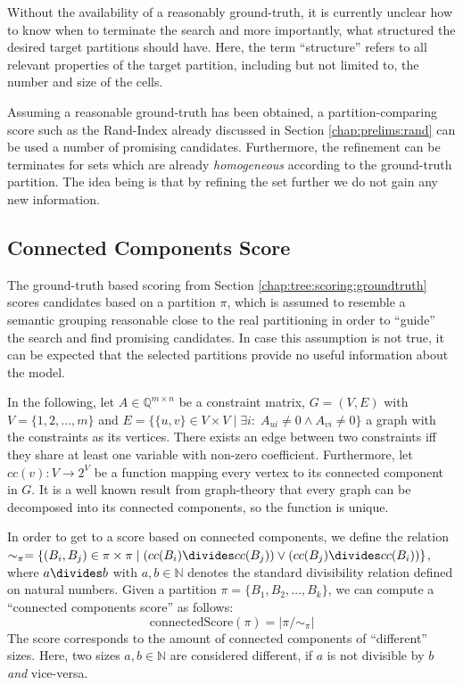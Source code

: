 			Without the availability of a reasonably ground-truth, it is currently unclear how to know when to terminate the search and more importantly, what structured the desired target partitions should have.
			Here, the term \enquote{structure} refers to all relevant properties of the target partition, including but not limited to, the number and size of the cells.
			
			Assuming a reasonable ground-truth has been obtained, a partition-comparing score such as the Rand-Index already discussed in Section \ref{chap:prelims:rand} can be used a number of promising candidates.
			Furthermore, the refinement can be terminates for sets which are already \textit{homogeneous} according to the ground-truth partition.
			The idea being is that by refining the set further we do not gain any new information.
			
			\clearpage
	
		\subsection{Connected Components Score}
	
			The ground-truth based scoring from Section \ref{chap:tree:scoring:groundtruth} scores candidates based on a partition $\pi$, which is assumed to resemble a semantic grouping reasonable close to the real partitioning in order to \enquote{guide} the search and find promising candidates.
			In case this assumption is not true, it can be expected that the selected partitions provide no useful information about the model.
			
			In the following, let $A \in \mathbb{Q}^{m \times n}$ be a constraint matrix, $G = (V, E)$ with $V = \{ 1, 2, \ldots, m \}$ and $E = \{ \{ u, v \} \in V \times V \mid \exists i: \; A_{ui} \neq 0 \land A_{vi} \neq 0 \}$ a graph with the constraints as its vertices.
			There exists an edge between two constraints iff they share at least one variable with non-zero coefficient.
			Furthermore, let $cc(v): V \xrightarrow{} 2^V$ be a function mapping every vertex to its connected component in $G$.
			It is a well known result from graph-theory that every graph can be decomposed into its connected components, so the function is unique.
			
			In order to get to a score based on connected components, we define the relation $\sim_\pi = \{ (B_i, B_j) \in \pi \times \pi \mid (cc(B_i) \divides cc(B_j)) \lor (cc(B_j) \divides cc(B_i)) \}$, where $a \divides b$ with $a, b \in \mathbb{N}$ denotes the standard divisibility relation defined on natural numbers. 
			Given a partition $\pi = \{ B_1, B_2, \ldots, B_k \}$, we can compute a \enquote{connected components score} as follows:
			\begin{equation*}
				\mathrm{connectedScore}(\pi) = |\pi/\sim_\pi|				
			\end{equation*}
			The score corresponds to the amount of connected components of \enquote{different} sizes.
			Here, two sizes $a, b \in \mathbb{N}$ are considered different, if $a$ is not divisible by $b$ \textit{and} vice-versa.
			
			\clearpage
